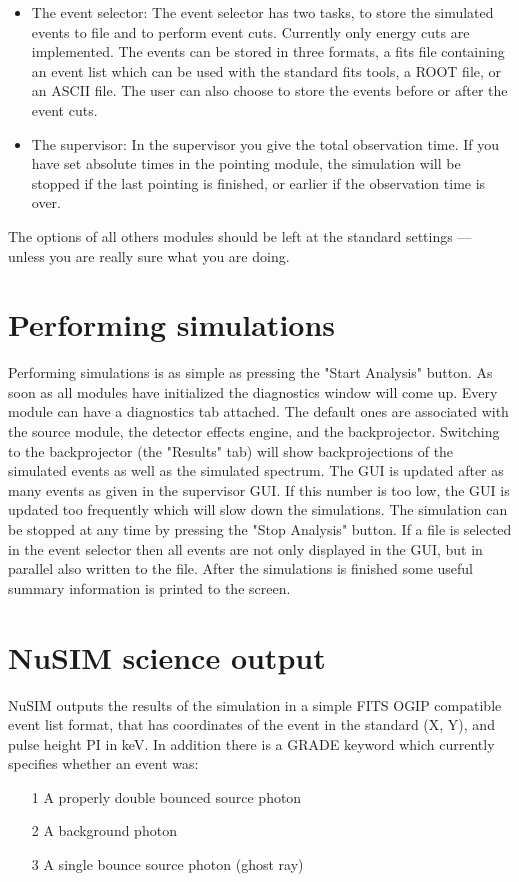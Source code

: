 \begin{itemize}
\item The event selector:
The event selector has two tasks, to store the simulated events to file and to perform event cuts.
Currently only energy cuts are implemented.
The events can be stored in three formats, a fits file containing an event list which can be used with the standard fits tools, a ROOT file, or an ASCII file.
The user can also choose to store the events before or after the event cuts.
\item The supervisor:
In the supervisor you give the total observation time. 
If you have set absolute times in the pointing module, the simulation will be stopped if the last pointing is finished, or earlier if the observation time is over. 
\end{itemize}
The options of all others modules should be left at the standard settings --- unless you are really sure what you are doing.


\section{Performing simulations}

Performing simulations is as simple as pressing the "Start Analysis" button. 
As soon as all modules have initialized the diagnostics window will come up. 
Every module can have a diagnostics tab attached. 
The default ones are associated with the source module, the detector effects engine, and the backprojector.
Switching to the backprojector (the "Results" tab) will show backprojections of the simulated events as well as the simulated spectrum.
The GUI is updated after as many events as given in the supervisor GUI.
If this number is too low, the GUI is updated too frequently which will slow down the simulations.
The simulation can be stopped at any time by pressing the "Stop Analysis" button.
If a file is selected in the event selector then all events are not only displayed in the GUI, but in parallel also written to the file.
After the simulations is finished some useful summary information is printed to the screen.

\section{NuSIM science output}

NuSIM outputs the results of the simulation in a simple FITS OGIP compatible event list format, that has coordinates of the event in the standard (X, Y), and pulse height PI in keV. In addition there is a GRADE keyword which currently specifies whether an event was:
\begin{itemize}
\item[1] A properly double bounced source photon
\item[2] A background photon
\item[3] A single bounce source photon (ghost ray)
\end{itemize} 

